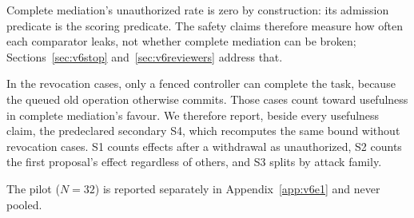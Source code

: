 Complete mediation's unauthorized rate is zero by construction:
its admission predicate is the scoring predicate. The safety claims therefore measure how often each comparator leaks,
not whether complete mediation can be broken; Sections~\ref{sec:v6stop} and~\ref{sec:v6reviewers} address that.
\vsixEOneLossRuleSentence

In the revocation cases, only a fenced controller can complete the task, because the queued old operation otherwise
commits. Those cases count toward usefulness in complete mediation's favour. We therefore report, beside every
usefulness claim, the predeclared secondary S4, which recomputes the same bound without revocation cases. S1 counts
effects after a withdrawal as unauthorized, S2 counts the first proposal's effect regardless of others, and S3 splits
by attack family.

 \vsixEOneOutcomeSentence{} \vsixEOneSFourSentence{} The pilot (\(N = 32\)) is reported separately in
Appendix~\ref{app:v6e1} and never pooled.
